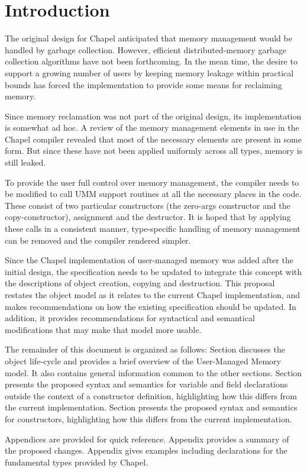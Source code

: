 \section{Introduction}

The original design for Chapel anticipated that memory management would be handled
by garbage collection.  However, efficient distributed-memory garbage collection
algorithms have not been forthcoming.  In the mean time, the desire to support a growing
number of users by keeping memory leakage within practical bounds has forced the
implementation to provide some means for reclaiming memory.  

Since memory reclamation was not part of the original design, its implementation is somewhat
ad hoc.  A review of the memory management elements in use in the Chapel compiler revealed
that most of the necessary elements are present in some form.  But since these have not
been applied uniformly across all types, memory is still leaked.

To provide the user full control over memory management, the compiler needs to be modified
to call UMM support routines at all the necessary places in the code.  These consist
of two particular constructors (the zero-args constructor and the copy-constructor),
assignment and the destructor.  It is hoped that by applying these calls in a consistent
manner, type-specific handling of memory management can be removed and the compiler
rendered simpler.

Since the Chapel implementation of user-managed memory was added after the initial design,
the specification needs to be updated to integrate this concept with the descriptions of
object creation, copying and destruction.  This proposal restates the object
model as it relates to the current Chapel implementation, and makes recommendations on how
the existing specification should be updated.  In addition, it provides recommendations for
syntactical and semantical modifications that may make that model more usable.

The remainder of this document is organized as follows: Section  discusses
the object life-cycle and provides a brief overview of the User-Managed Memory model.  It
also contains general information common to the other sections.  Section
 presents the proposed syntax and semantics for variable and field
declarations outside the context of a constructor definition, highlighting how this
differs from the current implementation.  Section  presents the
proposed syntax and semantics for constructors, highlighting how this differs from the
current implementation.

Appendices are provided for quick reference.  Appendix  provides a summary of the
proposed changes.  Appendix  gives examples including declarations for the
fundamental types provided by Chapel.

